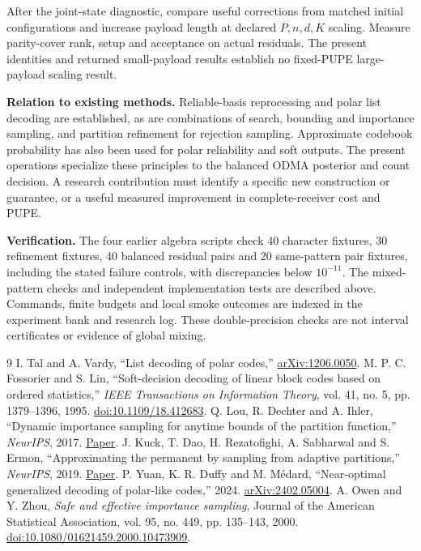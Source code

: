 \documentclass[10pt,a4paper]{article}
\begin{document}
After the joint-state diagnostic, compare useful corrections from matched initial configurations and
increase payload length at declared $P,n,d,K$ scaling. Measure parity-cover rank, setup and acceptance
on actual residuals. The present identities and returned small-payload results establish no fixed-PUPE
large-payload scaling result.

\textbf{Relation to existing methods.} Reliable-basis reprocessing and polar list decoding are
established\cite{fossorier,tal}, as are combinations of search, bounding and importance sampling, and
partition refinement for rejection sampling\cite{lou,kuck}. Approximate codebook probability has also
been used for polar reliability and soft outputs\cite{yuan}. The present operations specialize these
principles to the balanced ODMA posterior and count decision. A research contribution must identify a
specific new construction or guarantee, or a useful measured improvement in complete-receiver cost and PUPE.

\textbf{Verification.} The four earlier algebra scripts check 40 character fixtures, 30 refinement
fixtures, 40 balanced residual pairs and 20 same-pattern pair fixtures, including the stated failure
controls, with discrepancies below $10^{-11}$. The mixed-pattern checks and independent implementation
tests are described above. Commands, finite budgets and local smoke outcomes are indexed in the experiment
bank and research log. These double-precision checks are not interval certificates or evidence of global mixing.

\begin{thebibliography}{9}
 I. Tal and A. Vardy, ``List decoding of polar codes,''
\href{https://arxiv.org/abs/1206.0050}{arXiv:1206.0050}.
 M. P. C. Fossorier and S. Lin, ``Soft-decision decoding of linear block codes based on
ordered statistics,'' \emph{IEEE Transactions on Information Theory}, vol. 41, no. 5, pp. 1379--1396, 1995.
\href{https://doi.org/10.1109/18.412683}{doi:10.1109/18.412683}.
 Q. Lou, R. Dechter and A. Ihler, ``Dynamic importance sampling for anytime bounds of the
partition function,'' \emph{NeurIPS}, 2017.
\href{https://proceedings.neurips.cc/paper_files/paper/2017/file/1f1baa5b8edac74eb4eaa329f14a0361-Paper.pdf}{Paper}.
 J. Kuck, T. Dao, H. Rezatofighi, A. Sabharwal and S. Ermon,
``Approximating the permanent by sampling from adaptive partitions,'' \emph{NeurIPS}, 2019.
\href{https://proceedings.neurips.cc/paper_files/paper/2019/file/d914a6c6d93c8df063b9099a076a488c-Paper.pdf}{Paper}.
 P. Yuan, K. R. Duffy and M. M\'edard, ``Near-optimal generalized decoding of polar-like
codes,'' 2024. \href{https://arxiv.org/abs/2402.05004}{arXiv:2402.05004}.
 A. Owen and Y. Zhou, \emph{Safe and effective importance sampling},
Journal of the American Statistical Association, vol. 95, no. 449, pp. 135--143, 2000.
\href{https://doi.org/10.1080/01621459.2000.10473909}{doi:10.1080/01621459.2000.10473909}.
\end{thebibliography}
\end{document}
